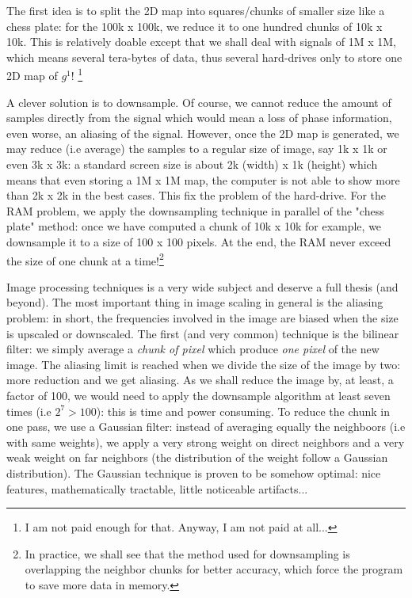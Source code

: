\documentclass[11pt]{report}
\begin{document}
The first idea is to split the 2D map into squares/chunks of smaller size like a chess plate: for the 100k x 100k, we reduce it to one hundred chunks of 10k x 10k. This is relatively doable except that we shall deal with signals of 1M x 1M, which means several tera-bytes of data, thus several hard-drives only to store one 2D map of $g^1$! \footnote{I am not paid enough for that. Anyway, I am not paid at all...}

A clever solution is to downsample. Of course, we cannot reduce the amount of samples directly from the signal which would mean a loss of phase information, even worse, an aliasing of the signal. However, once the 2D map is generated, we may reduce (i.e average) the samples to a regular size of image, say 1k x 1k or even 3k x 3k: a standard screen size is about 2k (width) x 1k (height) which means that even storing a 1M x 1M map, the computer is not able to show more than 2k x 2k in the best cases. This fix the problem of the hard-drive. For the RAM problem, we apply the downsampling technique in parallel of the "chess plate" method: once we have computed a chunk of 10k x 10k for example, we downsample it to a size of 100 x 100 pixels. At the end, the RAM never exceed the size of one chunk at a time!\footnote{In practice, we shall see that the method used for downsampling is overlapping the neighbor chunks for better accuracy, which force the program to save more data in memory.}

Image processing techniques is a very wide subject and deserve a full thesis (and beyond). The most important thing in image scaling in general is the aliasing problem: in short, the frequencies involved in the image are biased when the size is upscaled or downscaled. The first (and very common) technique is the bilinear filter: we simply average a \textit{chunk of pixel} which produce \textit{one pixel} of the new image. The aliasing limit is reached when we divide the size of the image by two: more reduction and we get aliasing. As we shall reduce the image by, at least, a factor of 100, we would need to apply the downsample algorithm at least seven times (i.e $2^7 > 100$): this is time and power consuming. To reduce the chunk in one pass, we use a Gaussian filter: instead of averaging equally the neighboors (i.e with same weights), we apply a very strong weight on direct neighbors and a very weak weight on far neighbors (the distribution of the weight follow a Gaussian distribution). The Gaussian technique is proven to be somehow optimal: nice features, mathematically tractable, little noticeable artifacts...
\end{document}
